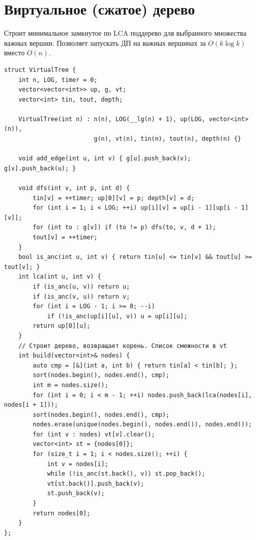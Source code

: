 \section{Виртуальное (сжатое) дерево}
Строит минимальное замкнутое по LCA поддерево для выбранного множества важных вершин.
Позволяет запускать ДП на важных вершинах за $O(k \log k)$ вместо $O(n)$.
\begin{lstlisting}[name=virtual_tree]
struct VirtualTree {
    int n, LOG, timer = 0;
    vector<vector<int>> up, g, vt;
    vector<int> tin, tout, depth;

    VirtualTree(int n) : n(n), LOG(__lg(n) + 1), up(LOG, vector<int>(n)),
                         g(n), vt(n), tin(n), tout(n), depth(n) {}

    void add_edge(int u, int v) { g[u].push_back(v); g[v].push_back(u); }

    void dfs(int v, int p, int d) {
        tin[v] = ++timer; up[0][v] = p; depth[v] = d;
        for (int i = 1; i < LOG; ++i) up[i][v] = up[i - 1][up[i - 1][v]];
        for (int to : g[v]) if (to != p) dfs(to, v, d + 1);
        tout[v] = ++timer;
    }
    bool is_anc(int u, int v) { return tin[u] <= tin[v] && tout[u] >= tout[v]; }
    int lca(int u, int v) {
        if (is_anc(u, v)) return u;
        if (is_anc(v, u)) return v;
        for (int i = LOG - 1; i >= 0; --i)
            if (!is_anc(up[i][u], v)) u = up[i][u];
        return up[0][u];
    }
    // Строит дерево, возвращает корень. Список смежности в vt
    int build(vector<int>& nodes) {
        auto cmp = [&](int a, int b) { return tin[a] < tin[b]; };
        sort(nodes.begin(), nodes.end(), cmp);
        int m = nodes.size();
        for (int i = 0; i < m - 1; ++i) nodes.push_back(lca(nodes[i], nodes[i + 1]));
        sort(nodes.begin(), nodes.end(), cmp);
        nodes.erase(unique(nodes.begin(), nodes.end()), nodes.end());
        for (int v : nodes) vt[v].clear();
        vector<int> st = {nodes[0]};
        for (size_t i = 1; i < nodes.size(); ++i) {
            int v = nodes[i];
            while (!is_anc(st.back(), v)) st.pop_back();
            vt[st.back()].push_back(v);
            st.push_back(v);
        }
        return nodes[0];
    }
};
\end{lstlisting}

